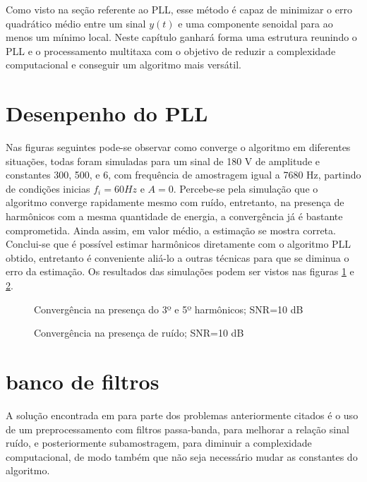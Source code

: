 	
Como visto na seção referente ao PLL, esse método é capaz de minimizar o erro quadrático médio entre um sinal $y(t)$ e uma componente senoidal para ao menos um mínimo local. Neste capítulo ganhará forma uma estrutura reunindo o PLL e o processamento multitaxa com o objetivo de reduzir a complexidade computacional e conseguir um algoritmo mais versátil. 

\section{Desenpenho do PLL}
Nas figuras seguintes pode-se observar como converge o algoritmo em diferentes situações, todas foram simuladas para um sinal de 180 V de amplitude e constantes 300, 500, e 6, com frequência de amostragem igual a 7680 Hz, partindo de condições inicias $f_i=60 Hz$ e $A=0$. Percebe-se pela simulação que o algoritmo converge rapidamente mesmo com ruído, entretanto, na presença de harmônicos com a mesma quantidade de energia, a convergência já é bastante comprometida. Ainda assim, em valor médio, a estimação se mostra correta. Conclui-se que é possível estimar harmônicos diretamente com o algoritmo PLL obtido, entretanto é conveniente aliá-lo a outras técnicas para que se diminua o erro da estimação. Os resultados das simulações podem ser vistos nas figuras \ref{fig:PLL_conv1} e \ref{fig:PLL_conv2}.

\begin{figure}[h]
	\centering    
	\def\svgwidth{\columnwidth}
	
	\caption{Convergência na presença do 3º e 5º harmônicos; SNR=10 dB}
	\label{fig:PLL_conv1}
\end{figure}

\begin{figure}[h]
	\centering    
	\def\svgwidth{\columnwidth}
	
	\caption{Convergência na presença de ruído; SNR=10 dB}
	\label{fig:PLL_conv2}
\end{figure}

\section{banco de filtros}

\indent A solução encontrada em \cite{de2009pll} para parte dos problemas anteriormente citados é o uso de um preprocessamento com filtros passa-banda, para melhorar a relação sinal ruído, e posteriormente subamostragem, para diminuir a complexidade computacional, de modo também que não seja necessário mudar as constantes do algoritmo.

